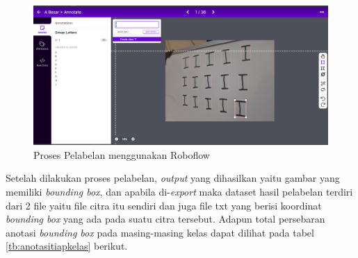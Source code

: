 \begin{figure}[H]
  \centering
  \includegraphics[scale=0.2]{gambar/labelling.png}
  \caption{Proses Pelabelan menggunakan Roboflow}
  \label{fig:labellingroboflow}
\end{figure}

Setelah dilakukan proses pelabelan, \textit{output} yang dihasilkan yaitu gambar yang memiliki \textit{bounding box}, dan apabila di-\textit{export} maka dataset hasil pelabelan terdiri dari 2 file yaitu file citra itu sendiri dan juga file txt yang berisi koordinat \textit{bounding box} yang ada pada suatu citra tersebut. Adapun total persebaran anotasi \textit{bounding box} pada masing-masing kelas dapat dilihat pada tabel \ref{tb:anotasitiapkelas} berikut. \par

